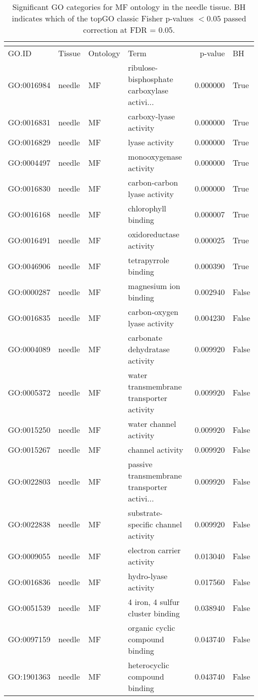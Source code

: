 \begin{longtable}{llllrl}
\caption{Significant GO categories for MF ontology in the needle tissue. BH indicates which of the topGO classic Fisher p-values $< 0.05$ passed correction at FDR = 0.05.}\\
\label{tab:go-needle-MF}\\
\toprule
GO.ID & Tissue & Ontology & Term & p-value & BH \\
\midrule
GO:0016984 & needle & MF &   ribulose-bisphosphate carboxylase activi...  & 0.000000 &   True \\
GO:0016831 & needle & MF &   carboxy-lyase activity  & 0.000000 &   True \\
GO:0016829 & needle & MF &   lyase activity  & 0.000000 &   True \\
GO:0004497 & needle & MF &   monooxygenase activity  & 0.000000 &   True \\
GO:0016830 & needle & MF &   carbon-carbon lyase activity  & 0.000000 &   True \\
GO:0016168 & needle & MF &   chlorophyll binding  & 0.000007 &   True \\
GO:0016491 & needle & MF &   oxidoreductase activity  & 0.000025 &   True \\
GO:0046906 & needle & MF &   tetrapyrrole binding  & 0.000390 &   True \\
GO:0000287 & needle & MF &   magnesium ion binding  & 0.002940 &   False \\
GO:0016835 & needle & MF &   carbon-oxygen lyase activity  & 0.004230 &   False \\
GO:0004089 & needle & MF &   carbonate dehydratase activity  & 0.009920 &   False \\
GO:0005372 & needle & MF &   water transmembrane transporter activity  & 0.009920 &   False \\
GO:0015250 & needle & MF &   water channel activity  & 0.009920 &   False \\
GO:0015267 & needle & MF &   channel activity  & 0.009920 &   False \\
GO:0022803 & needle & MF &   passive transmembrane transporter activi...  & 0.009920 &   False \\
GO:0022838 & needle & MF &   substrate-specific channel activity  & 0.009920 &   False \\
GO:0009055 & needle & MF &   electron carrier activity  & 0.013040 &   False \\
GO:0016836 & needle & MF &   hydro-lyase activity  & 0.017560 &   False \\
GO:0051539 & needle & MF &   4 iron, 4 sulfur cluster binding  & 0.038940 &   False \\
GO:0097159 & needle & MF &   organic cyclic compound binding  & 0.043740 &   False \\
GO:1901363 & needle & MF &   heterocyclic compound binding  & 0.043740 &   False \\
\bottomrule
\end{longtable}
